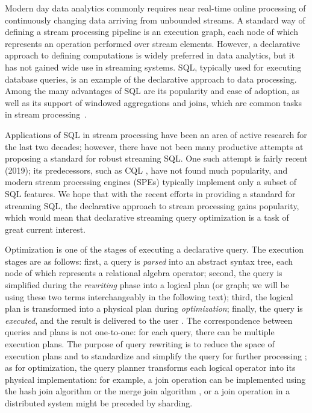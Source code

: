 \label {fs-optimization-introduction}

Modern day data analytics commonly requires near real-time online processing of continuously changing data arriving from unbounded streams. A standard way of defining a stream processing pipeline is an execution graph, each node of which represents an operation performed over stream elements. However, a declarative approach to defining computations is widely preferred in data analytics, but it has not gained wide use in streaming systems. SQL, typically used for executing database queries, is an example of the declarative approach to data processing. Among the many advantages of SQL are its popularity and ease of adoption, as well as its support of windowed aggregations and joins, which are common tasks in stream processing~\cite{carbone2018scalable}. 

Applications of SQL in stream processing have been an area of active research for the last two decades; however, there have not been many productive attempts at proposing a standard for robust streaming SQL. One such attempt \cite{Begoli:2019:OSR:3299869.3314040} is fairly recent (2019); its predecessors, such as CQL \cite{Arasu:2006:CCQ:1146461.1146463}, have not found much popularity, and modern stream processing engines (SPEs) typically implement only a subset of SQL features. We hope that with the recent efforts in providing a standard for streaming SQL, the declarative approach to stream processing gains popularity, which would mean that declarative streaming query optimization is a task of great current interest.

Optimization is one of the stages of executing a declarative query. The execution stages are as follows: first, a query is \textit{parsed} into an abstract syntax tree, each node of which represents a relational algebra operator; second, the query is simplified during the \textit{rewriting} phase into a logical plan (or graph; we will be using these two terms interchangeably in the following text); third, the logical plan is transformed into a physical plan during \textit{optimization}; finally, the query is \textit{executed}, and the result is delivered to the user \cite{Pitoura2018processing}. The correspondence between queries and plans is not one-to-one: for each query, there can be multiple execution plans. The purpose of query rewriting is to reduce the space of execution plans and to standardize and simplify the query for further processing \cite{Pitoura2018rewriting}; as for optimization, the query planner transforms each logical operator into its physical implementation: for example, a join operation can be implemented using the hash join algorithm or the merge join algorithm \cite{Neumann2018optimization}, or a join operation in a distributed system might be preceded by sharding.  

